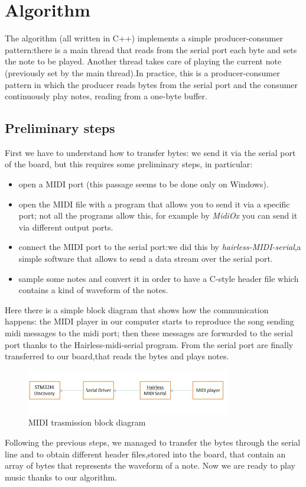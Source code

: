 \documentclass[12pt]{article}
\begin{document}
\section{Algorithm} \label{sec:algorithm}
The algorithm (all written in C++) implements a simple producer-consumer pattern:there is a main thread that reads from the serial port each byte and sets the note to be played. Another thread takes care of playing the current note (previously set by the main thread).In practice, this is a producer-consumer pattern in which the producer reads bytes from the serial port and the consumer continuously play notes, reading from a one-byte buffer.

\subsection{Preliminary steps}
First we have to understand how to transfer bytes: we send it via the serial port of the board, but this requires some preliminary steps, in particular:
\begin{itemize}
	\item open a MIDI port (this passage seems to be done only on Windows).
	\item open the MIDI file with a program that allows you to send it via a specific port; not all the programs allow this, for example by \textit{MidiOx}  you can send it via different output ports.
	\item connect the MIDI port to the serial port:we did this by \textit{hairless-MIDI-serial},a simple software that allows to send a data stream over the serial port.
	\item sample some notes and convert it in order to have a C-style header file which contains a kind of waveform of the notes.
\end{itemize}
Here there is a simple block diagram that shows how the communication happens: the MIDI player in our computer starts to reproduce the song sending midi messages to the midi port; then these messages are forwarded to the serial port thanks to the Hairless-midi-serial program. From the serial port are finally transferred to our board,that reads the bytes and plays notes.
 \begin{figure}[H]
 	\includegraphics[width=0.8\textwidth]{Schema.jpg}
 	\caption{MIDI trasmission block diagram}
 	\label{fig:block}
 \end{figure}
Following the previous steps, we managed to transfer the bytes through the serial line and to obtain different header files,stored into the board, that contain an array of bytes that represents the waveform of a note. Now we are ready to play music thanks to our algorithm.
\end{document}
